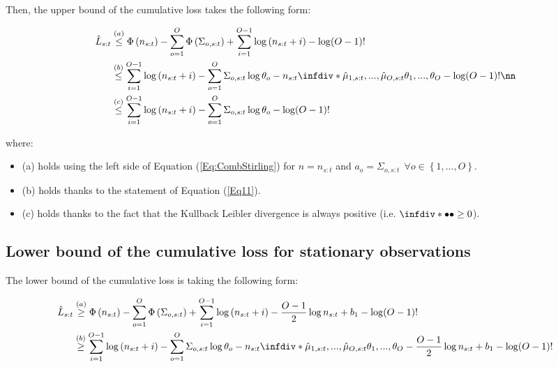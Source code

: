\documentclass{article} %
\begin{document}
Then, the upper bound of the cumulative loss takes the following form:
 
	\begin{align}
	\hat{L}_{s:t} & \overset{(a)}{\leq}
  \Phi \left( n_{s:t} \right) - \sum_{o=1}^{O} \Phi \left( \Sigma_{o,s:t} \right) + \sum_{i=1}^{O-1} \log \left( n_{s:t}+i  \right) - \log (O-1)! \label{Eq::FirstUpperBound} \\
 & \overset{(b)}{\leq} \sum_{i=1}^{O-1} \log \left( n_{s:t}+i  \right)  -  \sum_{o=1}^O  \Sigma_{o,s:t} \log \theta_o   -  n_{s:t}\infdiv*{\hat{\mu}_{1,s:t}, ..., \hat{\mu}_{O,s:t}}{\theta_1,...,\theta_O} - \log (O-1)! \nn \\
 & \overset{(c)}{\leq} \sum_{i=1}^{O-1} \log \left( n_{s:t}+i  \right)  -  \sum_{o=1}^O  \Sigma_{o,s:t} \log \theta_o - \log (O-1)!   \label{Eq::UpperBound}
	\end{align}



where:
\begin{itemize}
\setlength\itemsep{0.25em}
    \item (a) holds using the left side of Equation (\ref{Eq:CombStirling}) for $n = n_{s:t}$ and $a_o = \Sigma_{o,s:t} \  \ \forall o \in \left\lbrace 1,..., O \right\rbrace$.
    \item (b) holds thanks to the statement of Equation (\ref{Eq11}).
    \item (c) holds thanks to the fact that the Kullback Leibler divergence is always positive (i.e. $\infdiv*{\bullet}{\bullet} \geq 0$).
\end{itemize}

\subsection{Lower bound of the cumulative loss for stationary observations}

The lower bound of the cumulative loss is taking the following form:

	\begin{align}
	\hat{L}_{s:t} & \overset{(a)}{\geq}
  \Phi \left( n_{s:t} \right) - \sum_{o=1}^{O} \Phi \left( \Sigma_{o,s:t} \right) + \sum_{i=1}^{O-1} \log \left( n_{s:t}+i  \right) - \frac{O-1}{2} \log n_{s:t} + b_1 - \log (O-1)! \label{Eq::FirstLowerBound} \\
 & \overset{(b)}{\geq} \sum_{i=1}^{O-1} \log \left( n_{s:t}+i  \right)  - \sum_{o=1}^O  \Sigma_{o,s:t} \log \theta_o  -  n_{s:t}\infdiv*{\hat{\mu}_{1,s:t}, ..., \hat{\mu}_{O,s:t}}{\theta_1,...,\theta_O} - \frac{O-1}{2} \log n_{s:t} + b_1 - \log (O-1)! \label{Eq::LowerBound}  
 \end{align}
\end{document}
